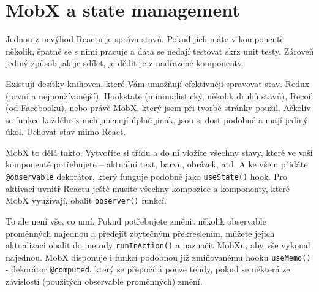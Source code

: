 \section{MobX a state management}

Jednou z nevýhod Reactu je správa stavů. Pokud jich máte v komponentě několik, špatně se s nimi pracuje a data se nedají testovat skrz unit testy. Zároveň jediný způsob jak je sdílet, je dědit je z nadřazené komponenty.

Existují desítky knihoven\cite{StateManagementLibs}, které Vám umožňují efektivněji spravovat stav. Redux (první a nejpoužívanější), Hookstate (minimalistický, několik druhů stavů), Recoil (od Facebooku), nebo právě MobX, který jsem při tvorbě stránky použil. Ačkoliv se funkce každého z nich jmenují úplně jinak, jsou si dost podobné a mají jediný úkol. Uchovat stav mimo React.

MobX to dělá takto. Vytvoříte si třídu a do ní vložíte všechny stavy, které ve vaší komponentě potřebujete – aktuální text, barvu, obrázek, atd. A ke všem přidáte \texttt{@observable} dekorátor, který funguje podobně jako \texttt{useState()} hook. Pro aktivaci uvnitř Reactu ještě musíte všechny kompozice a komponenty, které MobX využívají, obalit \texttt{observer()} funkcí.

To ale není vše, co umí. Pokud potřebujete změnit několik observable proměnných najednou a předejít zbytečným překreslením, můžete jejich aktualizaci obalit do metody \texttt{runInAction()} a naznačit MobXu, aby vše vykonal najednou. MobX disponuje i funkcí podobnou již zmiňovanému hooku \texttt{useMemo()} - dekorátor \texttt{@computed}\cite{MobXComputed}, který se přepočítá pouze tehdy, pokud se některá ze závislostí (použitých observable proměnných) změní.